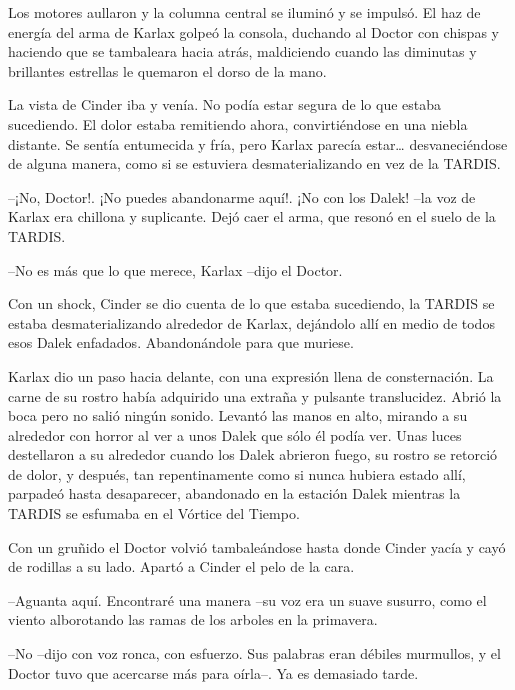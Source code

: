 Los motores aullaron y la columna central se iluminó y se impulsó. El haz de energía del arma de Karlax golpeó la consola, duchando al Doctor con chispas y haciendo que se tambaleara hacia atrás, maldiciendo cuando las diminutas y brillantes estrellas le quemaron el dorso de la mano.



La vista de Cinder iba y venía. No podía estar segura de lo que estaba sucediendo. El dolor estaba remitiendo ahora, convirtiéndose en una niebla distante. Se sentía entumecida y fría, pero Karlax parecía estar… desvaneciéndose de alguna manera, como si se estuviera desmaterializando en vez de la TARDIS.



--¡No, Doctor!. ¡No puedes abandonarme aquí!. ¡No con los Dalek! --la voz de Karlax era chillona y suplicante. Dejó caer el arma, que resonó en el suelo de la TARDIS.



--No es más que lo que merece, Karlax --dijo el Doctor.



Con un shock, Cinder se dio cuenta de lo que estaba sucediendo, la TARDIS se estaba desmaterializando alrededor de Karlax, dejándolo allí en medio de todos esos Dalek enfadados. Abandonándole para que muriese.



Karlax dio un paso hacia delante, con una expresión llena de consternación. La carne de su rostro había adquirido una extraña y pulsante translucidez. Abrió la boca pero no salió ningún sonido. Levantó las manos en alto, mirando a su alrededor con horror al ver a unos Dalek que sólo él podía ver. Unas luces destellaron a su alrededor cuando los Dalek abrieron fuego, su rostro se retorció de dolor, y después, tan repentinamente como si nunca hubiera estado allí, parpadeó hasta desaparecer, abandonado en la estación Dalek mientras la TARDIS se esfumaba en el Vórtice del Tiempo.



Con un gruñido el Doctor volvió tambaleándose hasta donde Cinder yacía y cayó de rodillas a su lado. Apartó a Cinder el pelo de la cara. 



--Aguanta aquí. Encontraré una manera --su voz era un suave susurro, como el viento alborotando las ramas de los arboles en la primavera.



--No --dijo con voz ronca, con esfuerzo. Sus palabras eran débiles murmullos, y el Doctor tuvo que acercarse más para oírla--. Ya es demasiado tarde.



